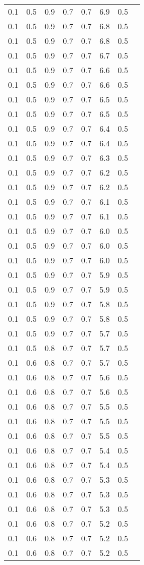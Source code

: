 \begin{tabular}{L{1in}|L{1in}|L{1in}|L{1in}|L{1in}|L{1in}|L{1in}|L{1in}}
0.1&0.5&0.9&0.7&0.7&6.9&0.5\\
0.1&0.5&0.9&0.7&0.7&6.8&0.5\\
0.1&0.5&0.9&0.7&0.7&6.8&0.5\\
0.1&0.5&0.9&0.7&0.7&6.7&0.5\\
0.1&0.5&0.9&0.7&0.7&6.6&0.5\\
0.1&0.5&0.9&0.7&0.7&6.6&0.5\\
0.1&0.5&0.9&0.7&0.7&6.5&0.5\\
0.1&0.5&0.9&0.7&0.7&6.5&0.5\\
0.1&0.5&0.9&0.7&0.7&6.4&0.5\\
0.1&0.5&0.9&0.7&0.7&6.4&0.5\\
0.1&0.5&0.9&0.7&0.7&6.3&0.5\\
0.1&0.5&0.9&0.7&0.7&6.2&0.5\\
0.1&0.5&0.9&0.7&0.7&6.2&0.5\\
0.1&0.5&0.9&0.7&0.7&6.1&0.5\\
0.1&0.5&0.9&0.7&0.7&6.1&0.5\\
0.1&0.5&0.9&0.7&0.7&6.0&0.5\\
0.1&0.5&0.9&0.7&0.7&6.0&0.5\\
0.1&0.5&0.9&0.7&0.7&6.0&0.5\\
0.1&0.5&0.9&0.7&0.7&5.9&0.5\\
0.1&0.5&0.9&0.7&0.7&5.9&0.5\\
0.1&0.5&0.9&0.7&0.7&5.8&0.5\\
0.1&0.5&0.9&0.7&0.7&5.8&0.5\\
0.1&0.5&0.9&0.7&0.7&5.7&0.5\\
0.1&0.5&0.8&0.7&0.7&5.7&0.5\\
0.1&0.6&0.8&0.7&0.7&5.7&0.5\\
0.1&0.6&0.8&0.7&0.7&5.6&0.5\\
0.1&0.6&0.8&0.7&0.7&5.6&0.5\\
0.1&0.6&0.8&0.7&0.7&5.5&0.5\\
0.1&0.6&0.8&0.7&0.7&5.5&0.5\\
0.1&0.6&0.8&0.7&0.7&5.5&0.5\\
0.1&0.6&0.8&0.7&0.7&5.4&0.5\\
0.1&0.6&0.8&0.7&0.7&5.4&0.5\\
0.1&0.6&0.8&0.7&0.7&5.3&0.5\\
0.1&0.6&0.8&0.7&0.7&5.3&0.5\\
0.1&0.6&0.8&0.7&0.7&5.3&0.5\\
0.1&0.6&0.8&0.7&0.7&5.2&0.5\\
0.1&0.6&0.8&0.7&0.7&5.2&0.5\\
0.1&0.6&0.8&0.7&0.7&5.2&0.5\\

\end{tabular}
